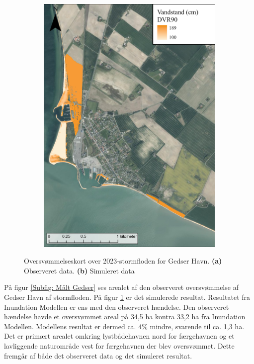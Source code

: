 \begin{figure}[H]
\begin{subfigure}[t]{0.5\textwidth}
        \includegraphics[width=0.95\linewidth]{images/Resultater/2023Model/2023 model_gedser.jpg}
        \caption{}
        \label{Subfig: Model Gedser}
    \end{subfigure}
    \caption{Oversvømmelseskort over 2023-stormfloden for Gedser Havn. \textbf{(a)} Observeret data. \textbf{(b)} Simuleret data}
    \label{Figur: Målt & simuleret Gedser}
\end{figure}
På figur \ref{Subfig: Målt Gedser} ses arealet af den observeret oversvømmelse af Gedser Havn af stormfloden. På figur \ref{Subfig: Model Gedser} er det simulerede resultat. Resultatet fra Inundation Modellen er ens med den observeret hændelse. Den observeret hændelse havde et oversvømmet areal på 34,5 ha kontra 33,2 ha fra Inundation Modellen. Modellens resultat er dermed ca. 4\% mindre, svarende til ca. 1,3 ha. Det er primært arealet omkring lystbådehavnen nord for færgehavnen og et lavliggende naturområde vest for færgehavnen der blev oversvømmet. Dette fremgår af både det observeret data og det simuleret resultat.\\


